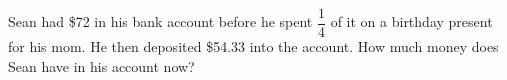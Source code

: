 Sean had \$72 in his bank account before he spent $\dfrac14$ of it on a birthday present for his mom. He then deposited \$54.33 into the account. How much money does Sean have in his account now?
